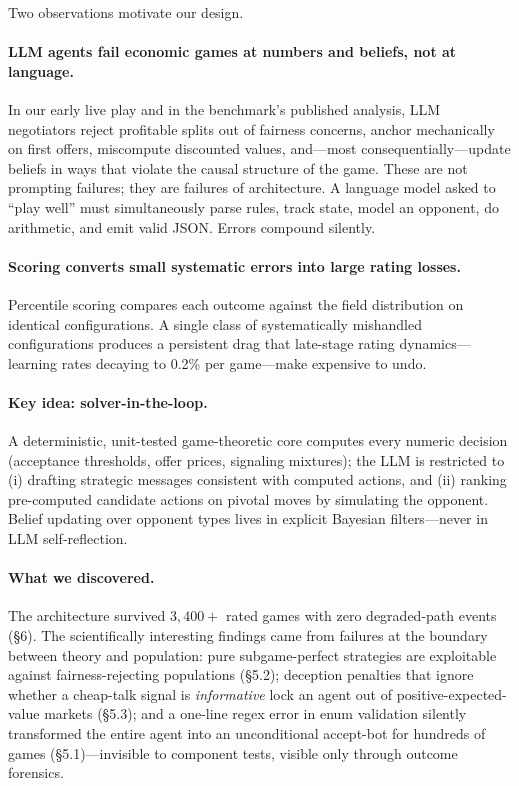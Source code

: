 \documentclass[11pt]{article}
\begin{document}
Two observations motivate our design.

\paragraph{LLM agents fail economic games at numbers and beliefs, not at language.} In our early live play and in the benchmark's published analysis, LLM negotiators reject profitable splits out of fairness concerns, anchor mechanically on first offers, miscompute discounted values, and---most consequentially---update beliefs in ways that violate the causal structure of the game. These are not prompting failures; they are failures of architecture. A language model asked to ``play well'' must simultaneously parse rules, track state, model an opponent, do arithmetic, and emit valid JSON. Errors compound silently.

\paragraph{Scoring converts small systematic errors into large rating losses.} Percentile scoring compares each outcome against the field distribution on identical configurations. A single class of systematically mishandled configurations produces a persistent drag that late-stage rating dynamics---learning rates decaying to 0.2\% per game---make expensive to undo.

\paragraph{Key idea: solver-in-the-loop.} A deterministic, unit-tested game-theoretic core computes every numeric decision (acceptance thresholds, offer prices, signaling mixtures); the LLM is restricted to (i) drafting strategic messages consistent with computed actions, and (ii) ranking pre-computed candidate actions on pivotal moves by simulating the opponent. Belief updating over opponent types lives in explicit Bayesian filters---never in LLM self-reflection.

\paragraph{What we discovered.} The architecture survived $3{,}400+$ rated games with zero degraded-path events (\S6). The scientifically interesting findings came from failures at the boundary between theory and population: pure subgame-perfect strategies are exploitable against fairness-rejecting populations (\S5.2); deception penalties that ignore whether a cheap-talk signal is \emph{informative} lock an agent out of positive-expected-value markets (\S5.3); and a one-line regex error in enum validation silently transformed the entire agent into an unconditional accept-bot for hundreds of games (\S5.1)---invisible to component tests, visible only through outcome forensics.
\end{document}
